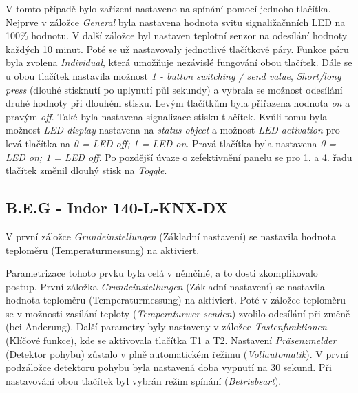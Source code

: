 V tomto případě bylo zařízení nastaveno na spínání pomocí jednoho tlačítka. Nejprve v záložce \textit{General} byla nastavena hodnota svitu signaližačnních LED na 100\% hodnotu. V další záložce byl nastaven teplotní senzor na odesílání hodnoty každých 10 minut. Poté se už nastavovaly jednotlivé tlačítkové páry. Funkce páru byla zvolena \textit{Individual}, která umožňuje nezávislé fungování obou tlačítek. Dále se u obou tlačítek nastavila možnost \textit{1 - button switching / send value}, \textit{Short/long press} (dlouhé stisknutí po uplynutí půl sekundy) a vybrala se možnost odesílání druhé hodnoty při dlouhém stisku. Levým tlačítkům byla přiřazena hodnota \textit{on} a pravým \textit{off}. Také byla nastavena signalizace stisku tlačítek. Kvůli tomu byla možnost \textit{LED display} nastavena na \textit{status object} a možnost \textit{LED activation} pro levá tlačítka na \textit{0 = LED off; 1 = LED on}. Pravá tlačítka byla nastavena \textit{0 = LED on; 1 = LED off}. Po pozdější úvaze o zefektivnění panelu se pro 1. a 4. řadu tlačítek změnil dlouhý stisk na \textit{Toggle}.  

\subsection{B.E.G - Indor 140-L-KNX-DX}
V první záložce \textit{Grundeinstellungen} (Základní nastavení) se nastavila hodnota teploměru (Temperaturmessung) na aktiviert. \cite{BEG}

Parametrizace tohoto prvku byla celá v němčině, a to dosti zkomplikovalo postup. První záložka \textit{Grundeinstellungen} (Základní nastavení) se nastavila hodnota teploměru (Temperaturmessung) na aktiviert. Poté v záložce teploměru se v možnosti zasílání teploty (\textit{Temperaturwer senden}) zvolilo odesílání při změně (bei Änderung). Další parametry byly nastaveny v záložce \textit{Tastenfunktionen} (Klíčové funkce), kde se aktivovala tlačítka T1 a T2. Nastavení \textit{Präsenzmelder} (Detektor pohybu) zůstalo v plně automatickém řežimu (\textit{Vollautomatik}). V první podzáložce detektoru pohybu byla nastavená doba vypnutí na 30 sekund. Při nastavování obou tlačítek byl vybrán režim spínání (\textit{Betriebsart}).

